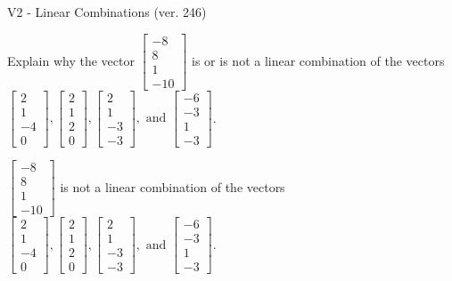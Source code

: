 \begin{exercise}
  \begin{exerciseTitle}V2 - Linear Combinations (ver. 246)\end{exerciseTitle}
  \begin{exerciseStatement}
    Explain why the vector \(\left[\begin{array}{c}
-8 \\
8 \\
1 \\
-10
\end{array}\right]\)  is or is not a linear 
	combination of the vectors \(\left[\begin{array}{c}
2 \\
1 \\
-4 \\
0
\end{array}\right] , \left[\begin{array}{c}
2 \\
1 \\
2 \\
0
\end{array}\right] , \left[\begin{array}{c}
2 \\
1 \\
-3 \\
-3
\end{array}\right] , \text{ and } \left[\begin{array}{c}
-6 \\
-3 \\
1 \\
-3
\end{array}\right]\).
	


  \end{exerciseStatement}
  \begin{exerciseAnswer}
   \(\left[\begin{array}{c}
-8 \\
8 \\
1 \\
-10
\end{array}\right]\) 
  	 is not  
	a linear combination of the vectors \(\left[\begin{array}{c}
2 \\
1 \\
-4 \\
0
\end{array}\right] , \left[\begin{array}{c}
2 \\
1 \\
2 \\
0
\end{array}\right] , \left[\begin{array}{c}
2 \\
1 \\
-3 \\
-3
\end{array}\right] , \text{ and } \left[\begin{array}{c}
-6 \\
-3 \\
1 \\
-3
\end{array}\right]\).


\end{exerciseAnswer}
\end{exercise}

